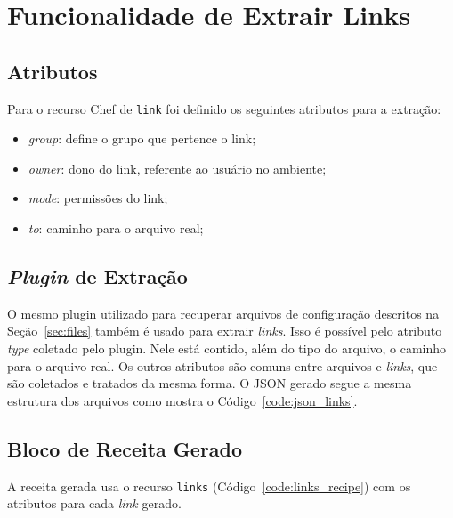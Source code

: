 \section{Funcionalidade de Extrair Links}
\label{sec:links}

\subsection{Atributos}
Para o recurso Chef de \texttt{link} foi definido os seguintes
atributos para a extração:

\begin{itemize}
  \item \textit{group}: define o grupo que pertence o link;
  \item \textit{owner}: dono do link, referente ao usuário no ambiente;
  \item \textit{mode}: permissões do link;
  \item \textit{to}: caminho para o arquivo real;
\end{itemize}

\subsection{\textit{Plugin} de Extração}

O mesmo plugin utilizado para recuperar arquivos de configuração descritos
na Seção~\ref{sec:files} também é usado para extrair \textit{links}. Isso é possível
pelo atributo \textit{type} coletado pelo plugin. Nele está contido, além do tipo do arquivo,
o caminho para o arquivo real. Os outros atributos são comuns entre arquivos e
\textit{links}, que são coletados e tratados da mesma forma. O JSON gerado segue a
mesma estrutura dos arquivos como mostra o Código~\ref{code:json_links}.

\noindent\begin{minipage}{\textwidth}
  \lstset{style=shell}
  
\end{minipage}\hfill

\subsection{Bloco de Receita Gerado}

A receita gerada usa o recurso \texttt{links} (Código~\ref{code:links_recipe}) com os
atributos para cada \textit{link} gerado.

